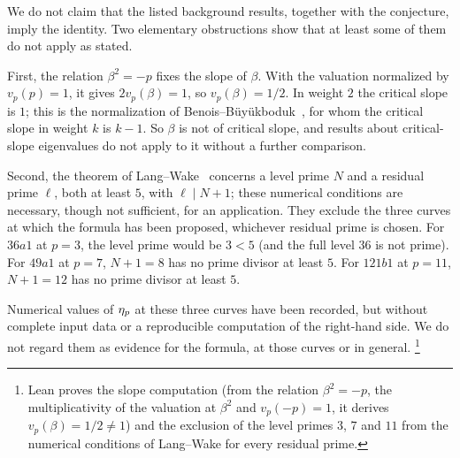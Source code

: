 We do not claim that the listed background results, together with the
conjecture, imply the identity.  Two elementary obstructions show that at
least some of them do not apply as stated.

First, the relation $\beta^2=-p$ fixes the slope of $\beta$.  With the
valuation normalized by $v_p(p)=1$, it gives $2v_p(\beta)=1$, so
$v_p(\beta)=1/2$.  In weight $2$ the critical slope is $1$; this is the
normalization of Benois--B\"uy\"ukboduk~\citep{BenoisBuyukboduk2024}, for
whom the critical slope in weight $k$ is $k-1$.  So $\beta$ is not of
critical slope, and results about critical-slope eigenvalues do not apply
to it without a further comparison.

Second, the theorem of Lang--Wake~\citep[Theorem~1.1]{LangWake2025}
concerns a level prime $N$ and a residual prime $\ell$, both at least $5$,
with $\ell\mid N+1$; these numerical conditions are necessary, though not
sufficient, for an application.  They exclude the three curves at which
the formula has been proposed, whichever residual prime is chosen.  For
$36a1$ at $p=3$, the level prime would be $3<5$ (and the full level $36$
is not prime).  For $49a1$ at $p=7$, $N+1=8$ has no prime divisor at least
$5$.  For $121b1$ at $p=11$, $N+1=12$ has no prime divisor at least $5$.

Numerical values of $\eta_p$ at these three curves have been recorded,
but without complete input data or a reproducible computation of the
right-hand side.  We do not regard them as evidence for the formula, at
those curves or in general.%
\footnote{Lean proves the slope computation (from the relation
$\beta^2=-p$, the multiplicativity of the valuation at $\beta^2$ and
$v_p(-p)=1$, it derives $v_p(\beta)=1/2\neq1$) and the exclusion of the
level primes $3$, $7$ and $11$ from the numerical conditions of
Lang--Wake for every residual prime.}
